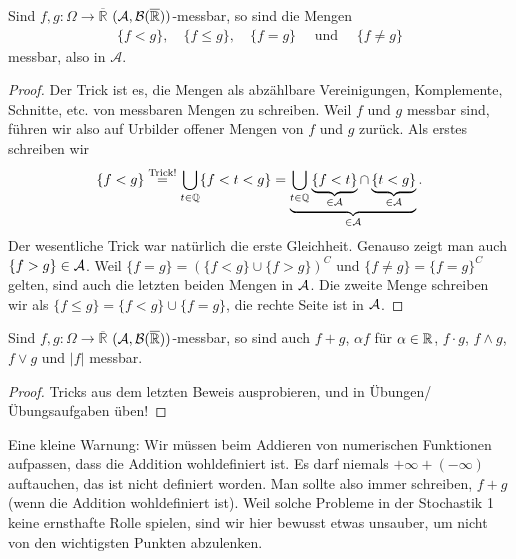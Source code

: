 \begin{lemma}
	Sind $f,g \! : \Omega \rightarrow \overline{\mathbb{R}}$ $(\mathcal{A}, \mathcal{B}(\overline{\mathbb{R}}))$-messbar, so sind die Mengen 
\begin{align*}
	\{ f < g \},\quad \{ f \leq g \}, \quad \{ f = g \}\quad\text{ und }\quad \{ f \neq g \}
\end{align*}	
	messbar, also in $\mathcal A$.
\end{lemma}

\begin{proof}
Der Trick ist es, die Mengen als abz\"ahlbare Vereinigungen, Komplemente, Schnitte, etc. von messbaren Mengen zu schreiben. Weil $f$ und $g$ messbar sind, f\"uhren wir also auf Urbilder offener Mengen von $f$ und $g$ zur\"uck. Als erstes schreiben wir 
 \begin{gather*}
		\{ f < g \} \overset{\text{Trick!}}{=} \bigcup\limits_{t \in \mathbb{Q}} \{ f < t < g \} =\underbrace{\bigcup\limits_{t \in \mathbb{Q}} \underbrace{\{ f < t \}}_{\in \mathcal{A}} \cap \underbrace{\{ t < g \}}_{\in \mathcal{A}}}_{\in \mathcal{A}}.
\end{gather*}	
Der wesentliche Trick war nat\"urlich die erste Gleichheit. Genauso zeigt man auch $\{ f > g \} \in \mathcal{A}$. Weil $\{ f = g \} = (\{ f < g \} \cup \{ f>g \})^C$ und $\{ f \neq g \} = \{ f = g \}^C$ gelten, sind auch die letzten beiden Mengen in $\mathcal{A}$. Die zweite Menge schreiben wir als $\{f\leq g\}=\{f<g\}\cup \{f=g\}$, die rechte Seite ist in $\mathcal{A}$.
\end{proof}

\begin{lemma}\label{hilf}
	Sind $f,g \! : \Omega \rightarrow \overline{\mathbb{R}}$ $(\mathcal{A}, \mathcal{B}(\overline{\mathbb{R}}))$-messbar, so sind auch $f+g$, $\alpha f$ f\"ur $\alpha\in \mathbb{R}$, $f \cdot g$, $f \land g$, $f \lor g$ und $|f|$ messbar.
\end{lemma}
\begin{proof}
	Tricks aus dem letzten Beweis ausprobieren, und in \"Ubungen/\"Ubungsaufgaben \"uben!
\end{proof}
Eine kleine Warnung: Wir m\"ussen beim Addieren von numerischen Funktionen aufpassen, dass die Addition wohldefiniert ist. Es darf niemals $+\infty+(-\infty)$ auftauchen, das ist nicht definiert worden. Man sollte also immer schreiben, \glqq$f+g$ (wenn die Addition wohldefiniert ist)\grqq. Weil solche Probleme in der Stochastik 1 keine ernsthafte Rolle spielen, sind wir hier bewusst etwas unsauber, um nicht von den wichtigsten Punkten abzulenken.\smallskip

